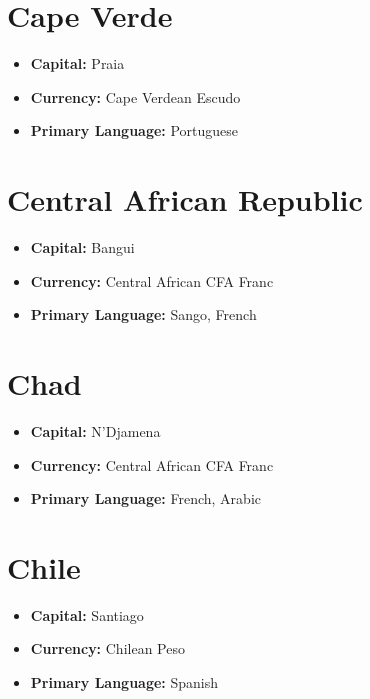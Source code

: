 \documentclass[a4paper,100pt,twoside]{book}
\begin{document}
\section*{\Huge Cape Verde}
\vspace{5mm} %
\begin{itemize}
	\item \textbf{Capital:} Praia
	\item \textbf{Currency:} Cape Verdean Escudo
	\item \textbf{Primary Language:} Portuguese
\end{itemize}

\section*{\Huge Central African Republic}
\vspace{5mm} %
\begin{itemize}
	\item \textbf{Capital:} Bangui
	\item \textbf{Currency:} Central African CFA Franc
	\item \textbf{Primary Language:} Sango, French
\end{itemize}

\section*{\Huge Chad}
\vspace{5mm} %
\begin{itemize}
	\item \textbf{Capital:} N'Djamena
	\item \textbf{Currency:} Central African CFA Franc
	\item \textbf{Primary Language:} French, Arabic
\end{itemize}

\section*{\Huge Chile}
\vspace{5mm} %
\begin{itemize}
	\item \textbf{Capital:} Santiago
	\item \textbf{Currency:} Chilean Peso
	\item \textbf{Primary Language:} Spanish
\end{itemize}
\end{document}
